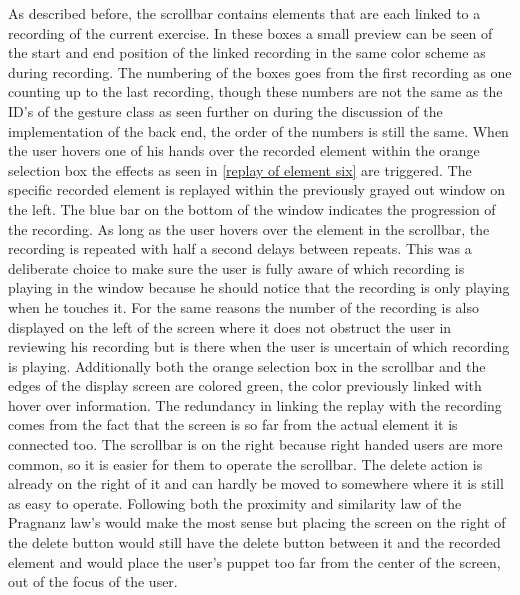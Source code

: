 As described before, the scrollbar contains elements that are each linked to a recording of the current exercise. In these boxes a small preview can be seen of the start and end position of the linked recording in the same color scheme as during recording. The numbering of the boxes goes from the first recording as one counting up to the last recording, though these numbers are not the same as the ID's of the gesture class as seen further on during the discussion of the implementation of the back end, the order of the numbers is still the same. When the user hovers one of his hands over the recorded element within the orange selection box the effects as seen in \ref{replay of element six} are triggered. The specific recorded element is replayed within the previously grayed out window on the left. The blue bar on the bottom of the window indicates the progression of the recording. As long as the user hovers over the element in the scrollbar, the recording is repeated with half a second delays between repeats. This was a deliberate choice to make sure the user is fully aware of which recording is playing in the window because he should notice that the recording is only playing when he touches it. For the same reasons the number of the recording is also displayed on the left of the screen where it does not obstruct the user in reviewing his recording but is there when the user is uncertain of which recording is playing. Additionally both the orange selection box in the scrollbar and the edges of the display screen are colored green, the color previously linked with hover over information. The redundancy in linking the replay with the recording comes from the fact that the screen is so far from the actual element it is connected too. The scrollbar is on the right because right handed users are more common, so it is easier for them to operate the scrollbar. The delete action is already on the right of it and can hardly be moved to somewhere where it is still as easy to operate. Following both the proximity and similarity law of the Pragnanz law's would make the most sense but placing the screen on the right of the delete button would still have the delete button between it and the recorded element and would place the user's puppet too far from the center of the screen, out of the focus of the user.\\


